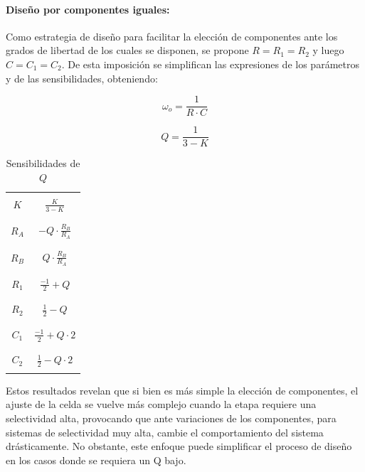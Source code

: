 \paragraph{Dise\~no por componentes iguales:} Como estrategia de dise\~no para facilitar la elecci\'on de componentes ante los grados de libertad de los cuales se disponen,
se propone $R = R_1 = R_2$ y luego $C = C_1 = C_2$. De esta imposici\'on se simplifican las expresiones de los par\'ametros y de las sensibilidades, obteniendo:

\begin{equation}
\omega_o = \frac{1}{R \cdot C}
\label{eq:wo_ajuste_componentes_iguales}
\end{equation}

\begin{equation}
Q = \frac{1}{3 - K}
\label{eq:q_ajuste_componentes_iguales}
\end{equation}

\begin{table}[H]
	\centering
	\begin{tabular}{c | c}
		\hline \\
		$K$ & $\frac{K}{3 - K}$ \\
		\\ \hline \\
		$R_A$ & $-Q \cdot \frac{R_B}{R_A}$ \\
		\\ \hline \\
		$R_B$ & $Q \cdot \frac{R_B}{R_A}$ \\
		\\ \hline \\
		$R_1$ & $\frac{-1}{2} + Q$ \\
		\\ \hline \\
		$R_2$ & $\frac{1}{2} - Q$ \\
		\\ \hline \\
		$C_1$ & $\frac{-1}{2} + Q \cdot 2$ \\
		\\ \hline \\
		$C_2$ & $\frac{1}{2} - Q \cdot 2$ \\
		\\ \hline
	\end{tabular}
	\caption{Sensibilidades de $Q$}
\end{table}

Estos resultados revelan que si bien es m\'as simple la elecci\'on de componentes, el ajuste de la celda se vuelve m\'as complejo cuando la etapa requiere una selectividad alta,
provocando que ante variaciones de los componentes, para sistemas de selectividad muy alta, cambie el comportamiento del sistema dr\'asticamente. No obstante, este enfoque puede simplificar
el proceso de dise\~no en los casos donde se requiera un Q bajo.

